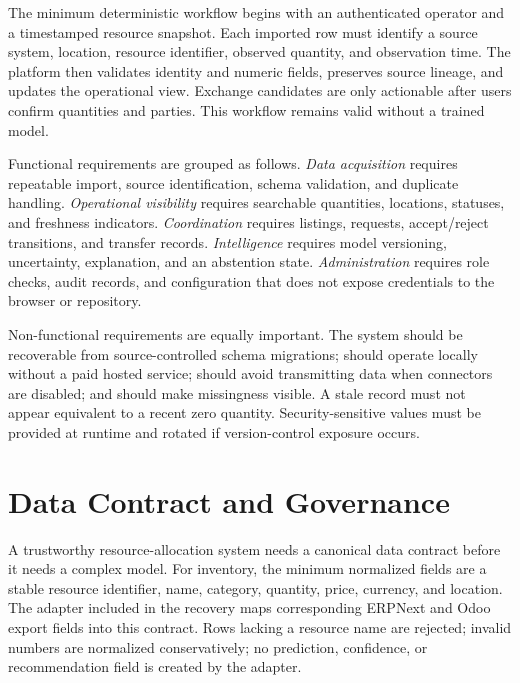 \documentclass[graybox]{svmult}
\begin{document}
The minimum deterministic workflow begins with an authenticated operator and a timestamped resource snapshot. Each imported row must identify a source system, location, resource identifier, observed quantity, and observation time. The platform then validates identity and numeric fields, preserves source lineage, and updates the operational view. Exchange candidates are only actionable after users confirm quantities and parties. This workflow remains valid without a trained model.

Functional requirements are grouped as follows. \emph{Data acquisition} requires repeatable import, source identification, schema validation, and duplicate handling. \emph{Operational visibility} requires searchable quantities, locations, statuses, and freshness indicators. \emph{Coordination} requires listings, requests, accept/reject transitions, and transfer records. \emph{Intelligence} requires model versioning, uncertainty, explanation, and an abstention state. \emph{Administration} requires role checks, audit records, and configuration that does not expose credentials to the browser or repository.

Non-functional requirements are equally important. The system should be recoverable from source-controlled schema migrations; should operate locally without a paid hosted service; should avoid transmitting data when connectors are disabled; and should make missingness visible. A stale record must not appear equivalent to a recent zero quantity. Security-sensitive values must be provided at runtime and rotated if version-control exposure occurs.

\section{Data Contract and Governance}
A trustworthy resource-allocation system needs a canonical data contract before it needs a complex model. For inventory, the minimum normalized fields are a stable resource identifier, name, category, quantity, price, currency, and location. The adapter included in the recovery maps corresponding ERPNext and Odoo export fields into this contract. Rows lacking a resource name are rejected; invalid numbers are normalized conservatively; no prediction, confidence, or recommendation field is created by the adapter.
\end{document}

